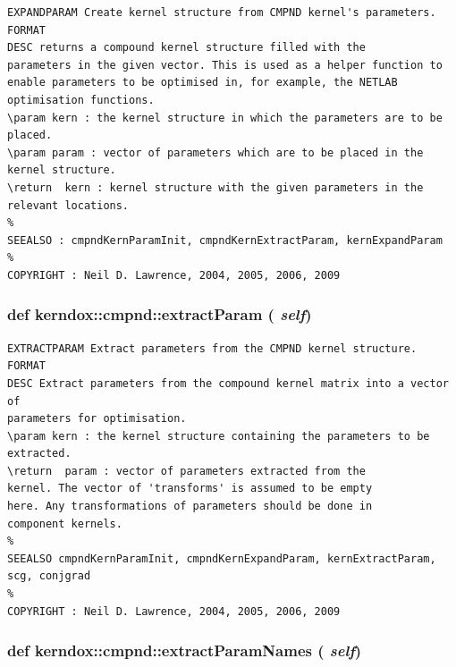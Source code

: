 \footnotesize\begin{verbatim}EXPANDPARAM Create kernel structure from CMPND kernel's parameters.
FORMAT
DESC returns a compound kernel structure filled with the
parameters in the given vector. This is used as a helper function to
enable parameters to be optimised in, for example, the NETLAB
optimisation functions.
\param kern : the kernel structure in which the parameters are to be
placed.
\param param : vector of parameters which are to be placed in the
kernel structure.
\return  kern : kernel structure with the given parameters in the
relevant locations.
%
SEEALSO : cmpndKernParamInit, cmpndKernExtractParam, kernExpandParam
%
COPYRIGHT : Neil D. Lawrence, 2004, 2005, 2006, 2009

\end{verbatim}
\normalsize
 \hypertarget{classkerndox_1_1cmpnd_a93cf33b23fb72063f34423a7f738d4e}{
\subsubsection[{extractParam}]{\setlength{\rightskip}{0pt plus 5cm}def kerndox::cmpnd::extractParam ( {\em self})}}
\label{classkerndox_1_1cmpnd_a93cf33b23fb72063f34423a7f738d4e}




\footnotesize\begin{verbatim}EXTRACTPARAM Extract parameters from the CMPND kernel structure.
FORMAT
DESC Extract parameters from the compound kernel matrix into a vector of
parameters for optimisation.
\param kern : the kernel structure containing the parameters to be
extracted.
\return  param : vector of parameters extracted from the
kernel. The vector of 'transforms' is assumed to be empty
here. Any transformations of parameters should be done in
component kernels.
%
SEEALSO cmpndKernParamInit, cmpndKernExpandParam, kernExtractParam, scg, conjgrad
%
COPYRIGHT : Neil D. Lawrence, 2004, 2005, 2006, 2009

\end{verbatim}
\normalsize
 \hypertarget{classkerndox_1_1cmpnd_15e6fbd563d2d6784c353ed8c9064792}{
\subsubsection[{extractParamNames}]{\setlength{\rightskip}{0pt plus 5cm}def kerndox::cmpnd::extractParamNames ( {\em self})}}
\label{classkerndox_1_1cmpnd_15e6fbd563d2d6784c353ed8c9064792}




